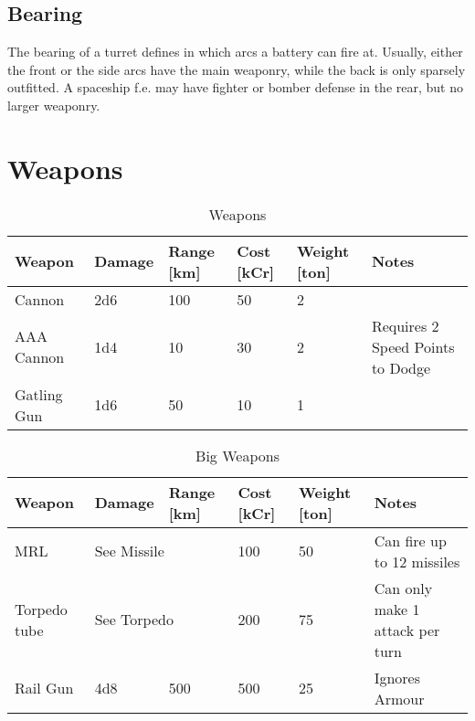 \subsection{Bearing}
\label{sub:Bearing}

The bearing of a turret defines in which arcs a battery can fire at. Usually, either the front or the side arcs have the main weaponry, while the back is only sparsely outfitted. A spaceship f.e. may have fighter or bomber defense in the rear, but no larger weaponry.

\section{Weapons}
\label{sec:Weapons}

\begin{table}[H]
  \centering
  \caption{Weapons}
  \label{tab:vessel-weapons}
  \begin{tabularx}{\textwidth}{|l|l|p{1.1cm}|p{1.1cm}|p{1.2cm}|X|}
    \hline
    Weapon      & Damage & Range [km] & Cost [kCr] & Weight [ton] & Notes                                   \\ \hline
    Cannon      & 2d6    & 100 & 50         & 2 & ~                                       \\ \hline
    AAA Cannon  & 1d4    & 10  & 30         & 2 & Requires 2 Speed Points to Dodge        \\ \hline
    Gatling Gun & 1d6    & 50  & 10         & 1 & ~ \\ \hline
  \end{tabularx}
\end{table}

\begin{table}[H]
  \centering
  \caption{Big Weapons}
  \begin{tabularx}{\textwidth}{|l|l|p{1.1cm}|p{1.2cm}|p{1.2cm}|X|}
    \hline
    Weapon       & Damage      & Range [km]       & Cost [kCr] & Weight [ton] & Notes                           \\ \hline
    MRL          & \multicolumn{2}{l|}{See Missile} & 100        & 50            & Can fire up to 12 missiles      \\ \hline
    Torpedo tube & \multicolumn{2}{l|}{See Torpedo} & 200        & 75            & Can only make 1 attack per turn \\ \hline
    Rail Gun     & 4d8         & 500      & 500        & 25            & Ignores Armour                  \\ \hline
  \end{tabularx}
\end{table}

